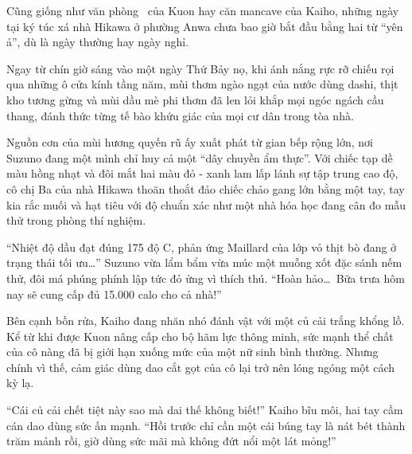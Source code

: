 ﻿\documentclass[../main.tex]{subfiles}
\begin{document}

Cũng giống như văn phòng \hll\ của Kuon hay căn mancave của Kaiho, những ngày tại ký túc xá nhà Hikawa ở phường Anwa chưa bao giờ bắt đầu bằng hai từ ``yên ả'', dù là ngày thường hay ngày nghỉ.

Ngay từ chín giờ sáng vào một ngày Thứ Bảy nọ, khi ánh nắng rực rỡ chiếu rọi qua những ô cửa kính tầng năm, mùi thơm ngào ngạt của nước dùng dashi, thịt kho tương gừng và mùi dầu mè phi thơm đã len lỏi khắp mọi ngóc ngách cầu thang, đánh thức từng tế bào khứu giác của mọi cư dân trong tòa nhà.

Nguồn cơn của mùi hương quyến rũ ấy xuất phát từ gian bếp rộng lớn, nơi Suzuno đang một mình chỉ huy cả một ``dây chuyền ẩm thực''. Với chiếc tạp dề màu hồng nhạt và đôi mắt hai màu đỏ - xanh lam lấp lánh sự tập trung cao độ, cô chị Ba của nhà Hikawa thoăn thoắt đảo chiếc chảo gang lớn bằng một tay, tay kia rắc muối và hạt tiêu với độ chuẩn xác như một nhà hóa học đang cân đo mẫu thử trong phòng thí nghiệm.

``Nhiệt độ dầu đạt đúng 175 độ C, phản ứng Maillard của lớp vỏ thịt bò đang ở trạng thái tối ưu\dots'' Suzuno vừa lẩm bẩm vừa múc một muỗng xốt đặc sánh nếm thử, đôi má phúng phính lập tức đỏ ửng vì thích thú. ``Hoàn hảo\dots\ Bữa trưa hôm nay sẽ cung cấp đủ 15.000 calo cho cả nhà!''

Bên cạnh bồn rửa, Kaiho đang nhăn nhó đánh vật với một củ cải trắng khổng lồ. Kể từ khi được Kuon nâng cấp cho bộ hãm lực thông minh, sức mạnh thể chất của cô nàng đã bị giới hạn xuống mức của một nữ sinh bình thường. Nhưng chính vì thế, cảm giác dùng dao cắt gọt của cô lại trở nên lóng ngóng một cách kỳ lạ.

``Cái củ cải chết tiệt này sao mà dai thế không biết!'' Kaiho bĩu môi, hai tay cầm cán dao dùng sức ấn mạnh. ``Hồi trước chỉ cần một cái búng tay là nát bét thành trăm mảnh rồi, giờ dùng sức mãi mà không đứt nổi một lát mỏng!''
\end{document}
